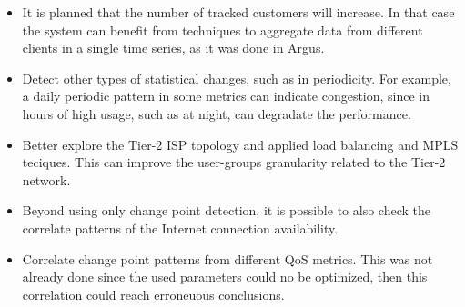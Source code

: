 \begin{itemize}
\item
It is planned that the number of tracked customers will increase. In that case
the system can benefit from techniques to aggregate data from different clients
in a single time series, as it was done in Argus.

\item
Detect other types of statistical changes, such as in periodicity. For example,
a daily periodic pattern in some metrics can indicate congestion, since in
hours of high usage, such as at night, can degradate the performance.

\item
Better explore the Tier-2 ISP topology and applied load balancing and MPLS
teciques. This can improve the user-groups granularity related to the Tier-2
network.

\item
Beyond using only change point detection, it is possible to also check the
correlate patterns of the Internet connection availability.

\item
Correlate change point patterns from different QoS metrics. This was not
already done since the used parameters could no be optimized,
then this correlation could reach erroneuous conclusions.

\end{itemize}
